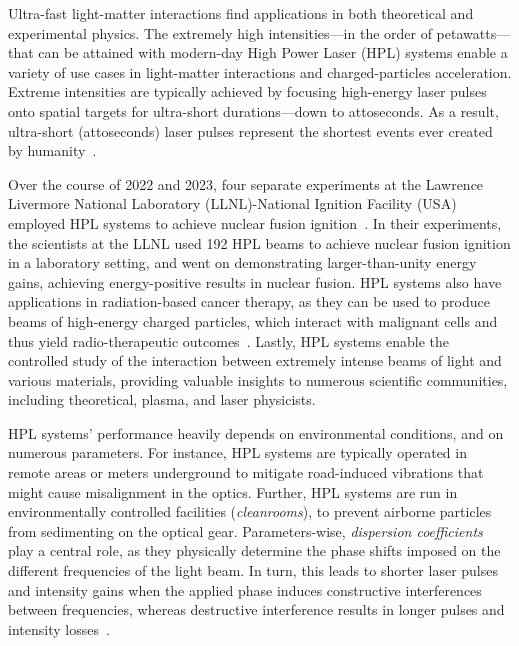 Ultra-fast light-matter interactions find applications in both theoretical and experimental physics. The extremely high intensities---in the order of petawatts---that can be attained with modern-day High Power Laser (HPL) systems enable a variety of use cases in light-matter interactions and charged-particles acceleration.
Extreme intensities are typically achieved by focusing high-energy laser pulses onto spatial targets for ultra-short durations---down to attoseconds. As a result, ultra-short (attoseconds) laser pulses represent the shortest events ever created by humanity~\citep{gaumnitz2017streaking}.

Over the course of 2022 and 2023, four separate experiments at the Lawrence Livermore National Laboratory (LLNL)-National Ignition Facility (USA) employed HPL systems to achieve nuclear fusion ignition~\citep{abu2024achievement}. 
In their experiments, the scientists at the LLNL used 192 HPL beams to achieve nuclear fusion ignition in a laboratory setting, and went on demonstrating larger-than-unity energy gains, achieving energy-positive results in nuclear fusion. 
HPL systems also have applications in radiation-based cancer therapy, as they can be used to produce beams of high-energy charged particles, which interact with malignant cells and thus yield radio-therapeutic outcomes~\citep{grittani2020device}. 
Lastly, HPL systems enable the controlled study of the interaction between extremely intense beams of light and various materials, providing valuable insights to numerous scientific communities, including theoretical, plasma, and laser physicists.

HPL systems' performance heavily depends on environmental conditions, and on numerous parameters. For instance, HPL systems are typically operated in remote areas or meters underground to mitigate road-induced vibrations that might cause misalignment in the optics. 
Further, HPL systems are run in environmentally controlled facilities (\textit{cleanrooms}), to prevent airborne particles from sedimenting on the optical gear. 
Parameters-wise, \textit{dispersion coefficients} play a central role, as they physically determine the phase shifts imposed on the different frequencies of the light beam. 
In turn, this leads to shorter laser pulses and intensity gains when the applied phase induces constructive interferences between frequencies, whereas destructive interference results in longer pulses and intensity losses~\citep{paschotta2008field}.

